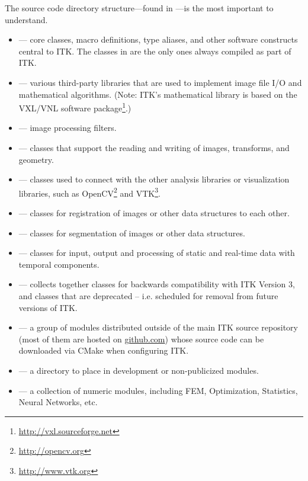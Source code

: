 The source code directory structure---found in ---is
the most important to understand.
\begin{itemize}
        \item {} --- core classes, macro definitions,
        type aliases, and other software constructs central to ITK. The classes
        in  are the only ones always compiled as part of ITK.
        \item {} --- various third-party libraries
        that are used to implement image file I/O and mathematical algorithms.
        (Note: ITK's mathematical library is based
        on the VXL/VNL software
        package\footnote{\url{http://vxl.sourceforge.net}}.)
        \item {} --- image processing filters.
        \item {} --- classes that support the reading
        and writing of images, transforms, and geometry.
        \item {} --- classes used to connect with the
        other analysis libraries or visualization libraries, such as
        OpenCV\footnote{\url{http://opencv.org}} and
        VTK\footnote{\url{http://www.vtk.org}}.
        \item {} --- classes for registration of
        images or other data structures to each other.
        \item {} --- classes for segmentation of
        images or other data structures.
        \item {} --- classes for input, output and processing
        of static and real-time data with temporal components.
        \item {} --- collects together classes
        for backwards compatibility with ITK Version 3, and classes that are
        deprecated -- i.e. scheduled for removal from future versions of ITK.
        \item {} --- a group of modules distributed outside
        of the main ITK source repository (most of them are hosted on \url{github.com})
        whose source code can be downloaded via CMake when configuring ITK.
        \item {} --- a directory to place in development
        or non-publicized modules.
        \item {} --- a collection of numeric modules, including
        FEM, Optimization, Statistics, Neural Networks, etc.
\end{itemize}

